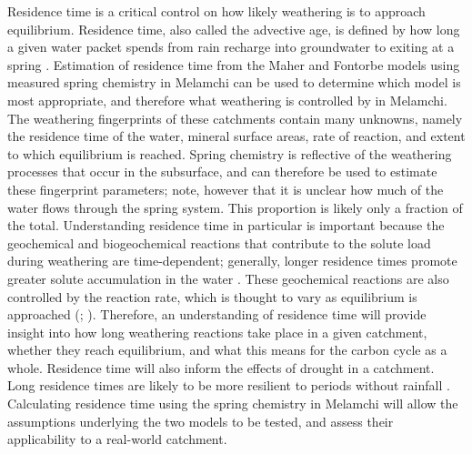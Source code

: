 Residence time is a critical control on how likely weathering is to approach equilibrium. Residence time, also called the advective age, is defined by how long a given water packet spends from rain recharge into groundwater to exiting at a spring \parencite{mccallumLimitationsUseEnvironmental2015}. Estimation of residence time from the Maher and Fontorbe models using measured spring chemistry in Melamchi can be used to determine which model is most appropriate, and therefore what weathering is controlled by in Melamchi. The weathering fingerprints of these catchments contain many unknowns, namely the residence time of the water, mineral surface areas, rate of reaction, and extent to which equilibrium is reached. Spring chemistry is reflective of the weathering processes that occur in the subsurface, and can therefore be used to estimate these fingerprint parameters; note, however that it is unclear how much of the water flows through the spring system. This proportion is likely only a fraction of the total. Understanding residence time in particular is important because the geochemical and biogeochemical reactions that contribute to the solute load during weathering are time-dependent; generally, longer residence times promote greater solute accumulation in the water \parencite{bernerRateControlMineral1978}. These geochemical reactions are also controlled by the reaction rate, which is thought to vary as equilibrium is approached (\cite{whiteEffectTimeWeathering2003}; \cite{maherRoleFluidResidence2011}). Therefore, an understanding of residence time will provide insight into how long weathering reactions take place in a given catchment, whether they reach equilibrium, and what this means for the carbon cycle as a whole. Residence time will also inform the effects of drought in a catchment. Long residence times are likely to be more resilient to periods without rainfall \parencite{atwoodCriticalZoneResponse2023}. Calculating residence time using the spring chemistry in Melamchi will allow the assumptions underlying the two models to be tested, and assess their applicability to a real-world catchment.

\bsk

